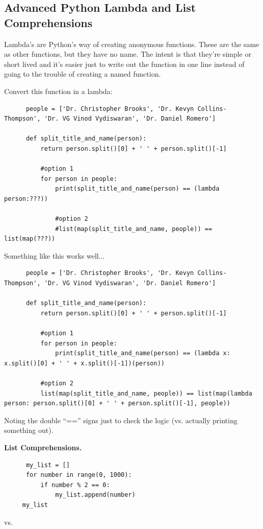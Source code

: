 \documentclass[11pt]{article}
\begin{document}
    \newpage
    \subsection{Advanced Python Lambda and List Comprehensions}
    Lambda's are Python's way of creating anonymous functions. These are the same as other functions, but they have no name. The intent is that they're simple or short lived and it's easier just to write out the function in one line instead of going to the trouble of creating a named function.
    
    \smallskip \smallskip \noindent
    Convert this function in a lambda:
    \begin{lstlisting}
      people = ['Dr. Christopher Brooks', 'Dr. Kevyn Collins-Thompson', 'Dr. VG Vinod Vydiswaran', 'Dr. Daniel Romero']

      def split_title_and_name(person):
          return person.split()[0] + ' ' + person.split()[-1]
      
          #option 1
          for person in people:
              print(split_title_and_name(person) == (lambda person:???))

              #option 2
              #list(map(split_title_and_name, people)) == list(map(???))
    \end{lstlisting}

    Something like this works well...
    \begin{lstlisting}
      people = ['Dr. Christopher Brooks', 'Dr. Kevyn Collins-Thompson', 'Dr. VG Vinod Vydiswaran', 'Dr. Daniel Romero']
      
      def split_title_and_name(person):
          return person.split()[0] + ' ' + person.split()[-1]
      
          #option 1
          for person in people:
              print(split_title_and_name(person) == (lambda x: x.split()[0] + ' ' + x.split()[-1])(person))

          #option 2
          list(map(split_title_and_name, people)) == list(map(lambda person: person.split()[0] + ' ' + person.split()[-1], people))
    \end{lstlisting}
    Noting the double ``=='' signs just to check the logic (vs. actually printing something out). 


    \smallskip     \smallskip \noindent
    {\bf List Comprehensions.}\\
    \begin{lstlisting}
      my_list = []
      for number in range(0, 1000):
          if number % 2 == 0:
              my_list.append(number)
     my_list
    \end{lstlisting}
      vs. 
\end{document}

